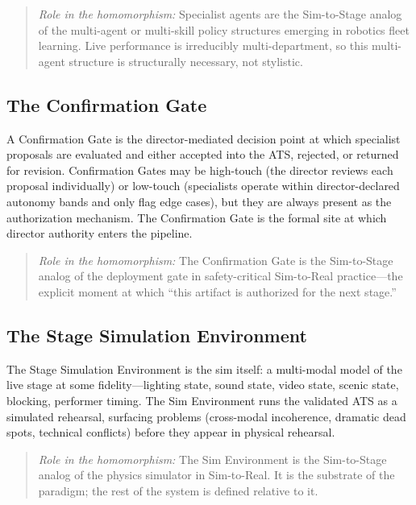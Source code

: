 \documentclass[11pt]{article}
\begin{document}
\begin{quote}
\textit{Role in the homomorphism:} Specialist agents are the Sim-to-Stage
analog of the multi-agent or multi-skill policy structures emerging in
robotics fleet learning.  Live performance is irreducibly multi-department,
so this multi-agent structure is structurally necessary, not stylistic.
\end{quote}

\subsection{The Confirmation Gate}
\label{sec:gate}

A Confirmation Gate is the director-mediated decision point at which
specialist proposals are evaluated and either accepted into the ATS,
rejected, or returned for revision.  Confirmation Gates may be high-touch
(the director reviews each proposal individually) or low-touch (specialists
operate within director-declared autonomy bands and only flag edge cases),
but they are always present as the authorization mechanism.  The
Confirmation Gate is the formal site at which director authority enters
the pipeline.

\begin{quote}
\textit{Role in the homomorphism:} The Confirmation Gate is the
Sim-to-Stage analog of the deployment gate in safety-critical Sim-to-Real
practice---the explicit moment at which ``this artifact is authorized for
the next stage.''
\end{quote}

\subsection{The Stage Simulation Environment}
\label{sec:sim-env}

The Stage Simulation Environment is the sim itself: a multi-modal model of
the live stage at some fidelity---lighting state, sound state, video state,
scenic state, blocking, performer timing.  The Sim Environment runs the
validated ATS as a simulated rehearsal, surfacing problems (cross-modal
incoherence, dramatic dead spots, technical conflicts) before they appear
in physical rehearsal.

\begin{quote}
\textit{Role in the homomorphism:} The Sim Environment is the Sim-to-Stage
analog of the physics simulator in Sim-to-Real.  It is the substrate of
the paradigm; the rest of the system is defined relative to it.
\end{quote}
\end{document}
